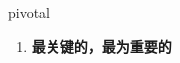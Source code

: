
\begin{frame}
{\huge pivotal}
\begin{center}
\begin{enumerate}\Large
  \item \textbf{最关键的，最为重要的}
\end{enumerate}
\end{center}
\end{frame}
